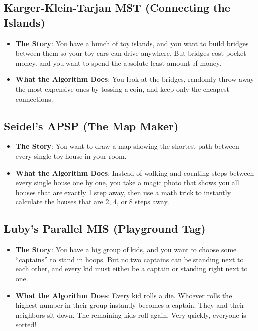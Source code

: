\documentclass[twoside,12pt]{book}
\theoremstyle{plain}
\theoremstyle{definition}
\theoremstyle{remark}
\begin{document}
\subsection{Karger-Klein-Tarjan MST (Connecting the Islands)}
\begin{itemize}
    \item \textbf{The Story}: You have a bunch of toy islands, and you want to build bridges between them so your toy cars can drive anywhere. But bridges cost pocket money, and you want to spend the absolute least amount of money.
    \item \textbf{What the Algorithm Does}: You look at the bridges, randomly throw away the most expensive ones by tossing a coin, and keep only the cheapest connections.
\end{itemize}

\subsection{Seidel's APSP (The Map Maker)}
\begin{itemize}
    \item \textbf{The Story}: You want to draw a map showing the shortest path between every single toy house in your room.
    \item \textbf{What the Algorithm Does}: Instead of walking and counting steps between every single house one by one, you take a magic photo that shows you all houses that are exactly 1 step away, then use a math trick to instantly calculate the houses that are 2, 4, or 8 steps away.
\end{itemize}

\subsection{Luby's Parallel MIS (Playground Tag)}
\begin{itemize}
    \item \textbf{The Story}: You have a big group of kids, and you want to choose some ``captains'' to stand in hoops. But no two captains can be standing next to each other, and every kid must either be a captain or standing right next to one.
    \item \textbf{What the Algorithm Does}: Every kid rolls a die. Whoever rolls the highest number in their group instantly becomes a captain. They and their neighbors sit down. The remaining kids roll again. Very quickly, everyone is sorted!
\end{itemize}
\end{document}
